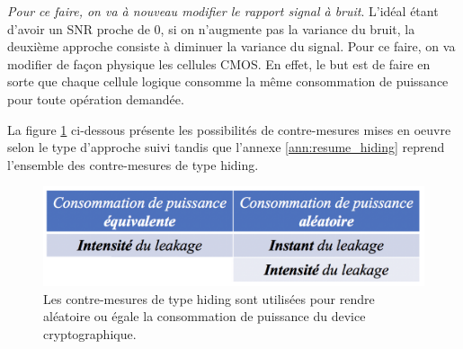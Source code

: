 \documentclass[oneside]{book}
\begin{document}
\begin{enumerate}
\textit{Pour ce faire, on va à nouveau modifier le rapport signal à bruit}. L'idéal étant d'avoir un SNR proche de 0, si on n'augmente pas la variance du bruit, la deuxième approche consiste à diminuer la variance du signal. Pour ce faire, on va modifier de façon physique les cellules CMOS. En effet, le but est de faire en sorte que chaque cellule logique consomme la même consommation de puissance pour toute opération demandée.
\end{enumerate}

La figure \ref{fig:hiding} ci-dessous présente les possibilités de contre-mesures mises en oeuvre selon le type d'approche suivi tandis que l'annexe \ref{ann:resume_hiding} reprend l'ensemble des contre-mesures de type hiding.

\begin{figure}[htbp]
    \centering
    \includegraphics[scale=0.5]{image/hiding}
    \caption{Les contre-mesures de type hiding sont utilisées pour rendre aléatoire ou égale la consommation de puissance du device cryptographique.}
    \label{fig:hiding} 
\end{figure}
\end{document}
